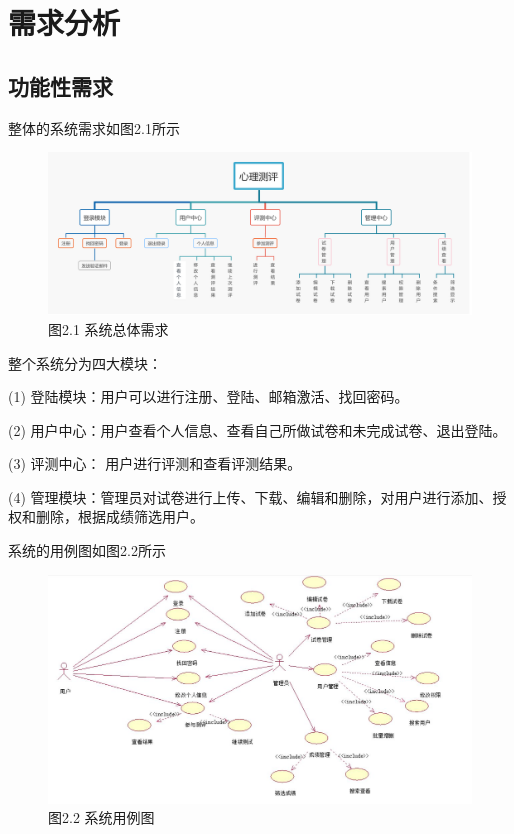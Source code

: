 \section{需求分析}

\subsection{功能性需求}

整体的系统需求如图2.1所示

\begin{figure}[thbp!]
	\centering
	\includegraphics[width=1.0\linewidth]{figure/functions}
	\label{fig:functions} \\
	图2.1 系统总体需求
\end{figure}


整个系统分为四大模块：

(1) 登陆模块：用户可以进行注册、登陆、邮箱激活、找回密码。

(2) 用户中心：用户查看个人信息、查看自己所做试卷和未完成试卷、退出登陆。

(3) 评测中心： 用户进行评测和查看评测结果。

(4) 管理模块：管理员对试卷进行上传、下载、编辑和删除，对用户进行添加、授权和删除，根据成绩筛选用户。

系统的用例图如图2.2所示

\begin{figure}[htp]
	\centering
	\includegraphics[width=0.7\linewidth]{figure/user_case}
	\label{fig:user_case} \\
	图2.2 系统用例图
\end{figure}

